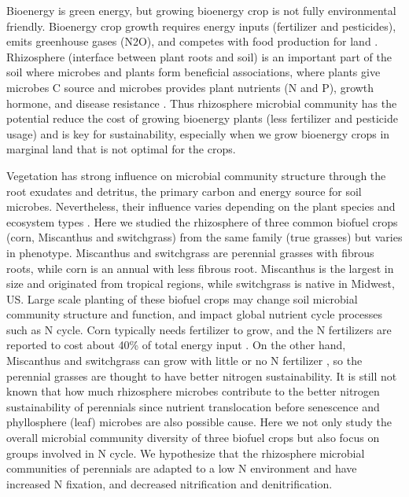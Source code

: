 \documentclass[]{msu-thesis}
\begin{document}
Bioenergy is green energy, but growing bioenergy crop is not fully environmental friendly. Bioenergy crop growth requires energy inputs (fertilizer and pesticides), emits greenhouse gases (N2O), and competes with food production for land \cite{crutzen_n2o_2008}. Rhizosphere (interface between plant roots and soil) is an important part of the soil where microbes and plants form beneficial associations, where plants give microbes C source and microbes provides plant nutrients (N and P), growth hormone, and disease resistance \cite{bulgarelli_structure_2013,baudoin_impact_2003,dennis_are_2010}. Thus rhizosphere microbial community has the potential reduce the cost of growing bioenergy plants (less fertilizer and pesticide usage) and is key for sustainability, especially when we grow bioenergy crops in marginal land that is not optimal for the crops.

Vegetation has strong influence on microbial community structure through the root exudates and detritus, the primary carbon and energy source for soil microbes. Nevertheless, their influence varies depending on the plant species and ecosystem types \cite{smalla_bulk_2001,mao_changes_2011}. Here we studied the rhizosphere of three common biofuel crops (corn, Miscanthus and switchgrass) from the same family (true grasses) but varies in phenotype. Miscanthus and switchgrass are perennial grasses with fibrous roots, while corn is an annual with less fibrous root. Miscanthus is the largest in size and originated from tropical regions, while switchgrass is native in Midwest, US. Large scale planting of these biofuel crops may change soil microbial community structure and function, and impact global nutrient cycle processes such as N cycle. Corn typically needs fertilizer to grow, and the N fertilizers are reported to cost about 40\% of total energy input \cite{camargo_energy_2013}. On the other hand, Miscanthus and switchgrass can grow with little or no N fertilizer \cite{schwarz_effect_1994,mao_impact_2013,parrish_biology_2005}, so the perennial grasses are thought to have better nitrogen sustainability. It is still not known that how much rhizosphere microbes contribute to the better nitrogen sustainability of perennials since nutrient translocation before senescence and phyllosphere (leaf) microbes are also possible cause. Here we not only study the overall microbial community diversity of three biofuel crops but also focus on groups involved in N cycle. We hypothesize that the rhizosphere microbial communities of perennials are adapted to a low N environment and have increased N fixation, and decreased nitrification and denitrification.
\end{document}
